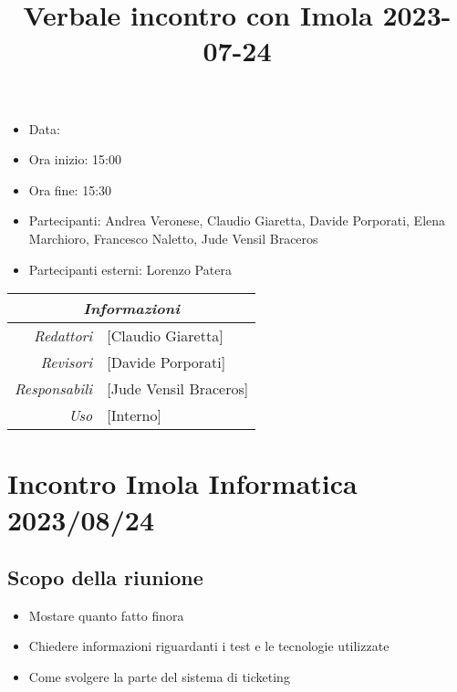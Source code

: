 \documentclass[12pt]{article}
\begin{document}
\graphicspath{ {../../templates/img} }

\title{Verbale incontro con Imola 2023-07-24}
\firstPage
\maketitle

\begin{center}
    \begin{itemize}
        \item[] Data: 
        \item[] Ora inizio: 15:00
        \item[] Ora fine: 15:30
        \item[] Partecipanti: Andrea Veronese, Claudio Giaretta, Davide Porporati, Elena Marchioro, Francesco Naletto, Jude Vensil Braceros
        \item[] Partecipanti esterni: Lorenzo Patera
        \end{itemize}
    \begin{tabular}{r | l}
		\multicolumn{2}{c}{\textit{Informazioni}}\\
		\hline
		
			\textit{Redattori} &
			[Claudio Giaretta]\makecell{}\\
		
			\textit{Revisori} &
			[Davide Porporati]\makecell{}\\
			\textit{Responsabili} &
			[Jude Vensil Braceros]\makecell{}\\
		      \textit{Uso} & 
                [Interno]\makecell{}\\
\end{tabular}
\end{center}

\tableofcontents
\printindex
\section{Incontro Imola Informatica 2023/08/24}
\subsection{Scopo della riunione}
\begin{itemize}
    \item Mostare quanto fatto finora
    \item Chiedere informazioni riguardanti i test e le tecnologie utilizzate
    \item Come svolgere la parte del sistema di ticketing
\end{itemize}
\end{document}
